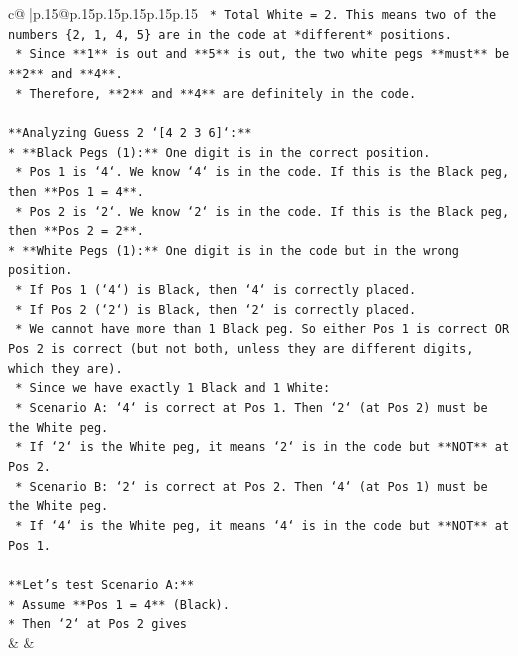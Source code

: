 \documentclass{article}
\begin{document}
{\begin{supertabular}{c@{$\;$}|p{.15\linewidth}@{}p{.15\linewidth}p{.15\linewidth}p{.15\linewidth}p{.15\linewidth}p{.15\linewidth}}
{{{\texttt{        *   Total White = 2. This means two of the numbers \{2, 1, 4, 5\} are in the code at *different* positions.} \\
\texttt{        *   Since **1** is out and **5** is out, the two white pegs **must** be **2** and **4**.} \\
\texttt{        *   Therefore, **2** and **4** are definitely in the code.} \\
\\ 
\texttt{**Analyzing Guess 2 `{[}4 2 3 6{]}`:**} \\
\texttt{*   **Black Pegs (1):** One digit is in the correct position.} \\
\texttt{    *   Pos 1 is `4`. We know `4` is in the code. If this is the Black peg, then **Pos 1 = 4**.} \\
\texttt{    *   Pos 2 is `2`. We know `2` is in the code. If this is the Black peg, then **Pos 2 = 2**.} \\
\texttt{*   **White Pegs (1):** One digit is in the code but in the wrong position.} \\
\texttt{    *   If Pos 1 (`4`) is Black, then `4` is correctly placed.} \\
\texttt{    *   If Pos 2 (`2`) is Black, then `2` is correctly placed.} \\
\texttt{    *   We cannot have more than 1 Black peg. So either Pos 1 is correct OR Pos 2 is correct (but not both, unless they are different digits, which they are).} \\
\texttt{    *   Since we have exactly 1 Black and 1 White:} \\
\texttt{        *   Scenario A: `4` is correct at Pos 1. Then `2` (at Pos 2) must be the White peg.} \\
\texttt{            *   If `2` is the White peg, it means `2` is in the code but **NOT** at Pos 2.} \\
\texttt{        *   Scenario B: `2` is correct at Pos 2. Then `4` (at Pos 1) must be the White peg.} \\
\texttt{            *   If `4` is the White peg, it means `4` is in the code but **NOT** at Pos 1.} \\
\\ 
\texttt{**Let's test Scenario A:**} \\
\texttt{*   Assume **Pos 1 = 4** (Black).} \\
\texttt{*   Then `2` at Pos 2 gives} \\
            }
        }
    }
    & & \\ \\


\end{supertabular}}
\end{document}
